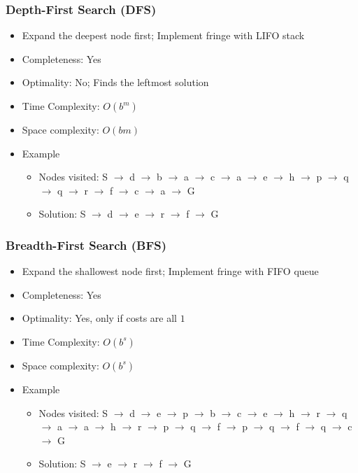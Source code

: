 \subsubsection*{Depth-First Search (DFS)}
\begin{itemize}
    \item Expand the deepest node first; Implement fringe with LIFO stack
    \item Completeness: Yes
    \item Optimality: No; Finds the leftmost solution
    \item Time Complexity: $O(b^m)$
    \item Space complexity: $O(bm)$
    \item Example
    \begin{itemize}
        \item Nodes visited: S $\to$ d $\to$ b $\to$ a $\to$ c $\to$ a $\to$ e $\to$ h $\to$ p $\to$ q $\to$ q $\to$ r $\to$ f $\to$ c $\to$ a $\to$ G
        \item Solution: S $\to$ d $\to$ e $\to$ r $\to$ f $\to$ G
    \end{itemize}
\end{itemize}
\begin{figures}
\end{figures}

\subsubsection*{Breadth-First Search (BFS)}
\begin{itemize}
    \item Expand the shallowest node first; Implement fringe with FIFO queue
    \item Completeness: Yes
    \item Optimality: Yes, only if costs are all $1$
    \item Time Complexity: $O(b^s)$
    \item Space complexity: $O(b^s)$
    \item Example
    \begin{itemize}
        \item Nodes visited: S $\to$ d $\to$ e $\to$ p $\to$ b $\to$ c $\to$ e $\to$ h $\to$ r $\to$ q $\to$ a $\to$ a $\to$ h $\to$ r $\to$ p $\to$ q $\to$ f $\to$ p $\to$ q $\to$ f $\to$ q $\to$ c $\to$ G
        \item Solution: S $\to$ e $\to$ r $\to$ f $\to$ G
    \end{itemize}
\end{itemize}
\begin{figures}
\end{figures}


